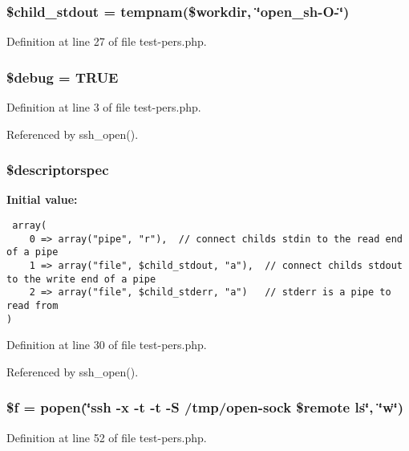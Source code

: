 \subsubsection{\setlength{\rightskip}{0pt plus 5cm}\$child\_\-stdout = tempnam(\$workdir, \char`\"{}open\_\-sh-O-\char`\"{})}\label{test-pers_8php_a6}




Definition at line 27 of file test-pers.php.
\subsubsection{\setlength{\rightskip}{0pt plus 5cm}\$debug = TRUE}\label{test-pers_8php_a0}




Definition at line 3 of file test-pers.php.

Referenced by ssh\_\-open().
\subsubsection{\setlength{\rightskip}{0pt plus 5cm}\$descriptorspec}\label{test-pers_8php_a8}


{\bf Initial value:}

\footnotesize\begin{verbatim} array(
    0 => array("pipe", "r"),  // connect childs stdin to the read end of a pipe
    1 => array("file", $child_stdout, "a"),  // connect childs stdout to the write end of a pipe
    2 => array("file", $child_stderr, "a")   // stderr is a pipe to read from
)
\end{verbatim}\normalsize 


Definition at line 30 of file test-pers.php.

Referenced by ssh\_\-open().
\subsubsection{\setlength{\rightskip}{0pt plus 5cm}\$f = popen(\char`\"{}ssh -x -t -t -S /tmp/open-sock \$remote ls\char`\"{}, \char`\"{}w\char`\"{})}\label{test-pers_8php_a10}




Definition at line 52 of file test-pers.php.
